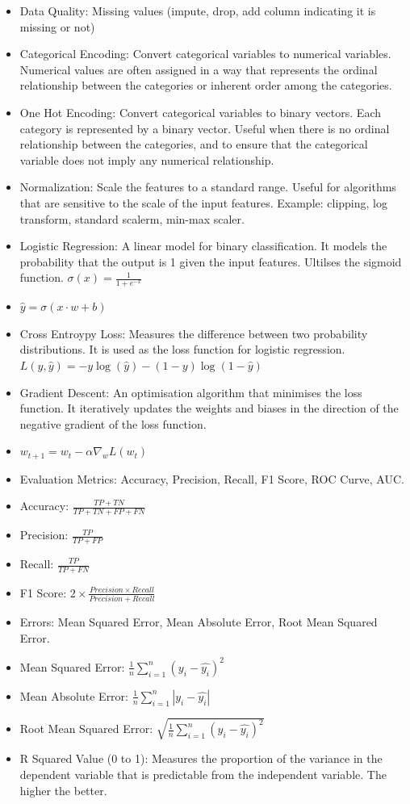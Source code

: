 \documentclass[10pt, landscape]{article}
\begin{document}
\begin{multicols*}{4}
  \begin{itemize}
    \item Data Quality: Missing values (impute, drop, add column indicating it is missing or not)
    \item Categorical Encoding: Convert categorical variables to numerical variables. Numerical values are often assigned in a way that represents the ordinal relationship between the categories or inherent order among the categories.
    \item One Hot Encoding: Convert categorical variables to binary vectors. Each category is represented by a binary vector. Useful when there is no ordinal relationship between the categories, and to ensure that the categorical variable does not imply any numerical relationship.
    \item Normalization: Scale the features to a standard range. Useful for algorithms that are sensitive to the scale of the input features. Example: clipping, log transform, standard scalerm, min-max scaler.
    \item Logistic Regression: A linear model for binary classification. It models the probability that the output is 1 given the input features. Ultilses the sigmoid function. $\sigma(x) = \frac{1}{1 + e^{-x}}$
    \item $ \hat{y} = \sigma(x \cdot w + b) $
    \item Cross Entroypy Loss: Measures the difference between two probability distributions. It is used as the loss function for logistic regression. $L(y, \hat{y}) = -y \log(\hat{y}) - (1 - y) \log(1 - \hat{y})$
    \item Gradient Descent: An optimisation algorithm that minimises the loss function. It iteratively updates the weights and biases in the direction of the negative gradient of the loss function.
    \item $w_{t+1} = w_t - \alpha \nabla_w L(w_t)$
    \item Evaluation Metrics: Accuracy, Precision, Recall, F1 Score, ROC Curve, AUC.
    \item Accuracy: $\frac{TP + TN}{TP + TN + FP + FN}$
    \item Precision: $\frac{TP}{TP + FP}$
    \item Recall: $\frac{TP}{TP + FN}$
    \item F1 Score: $2 \times \frac{Precision \times Recall}{Precision + Recall}$
    \item Errors: Mean Squared Error, Mean Absolute Error, Root Mean Squared Error.
    \item Mean Squared Error: $\frac{1}{n} \sum_{i=1}^{n} (y_i - \hat{y_i})^2$
    \item Mean Absolute Error: $\frac{1}{n} \sum_{i=1}^{n} |y_i - \hat{y_i}|$
    \item Root Mean Squared Error: $\sqrt{\frac{1}{n} \sum_{i=1}^{n} (y_i - \hat{y_i})^2}$
    \item R Squared Value (0 to 1): Measures the proportion of the variance in the dependent variable that is predictable from the independent variable. The higher the better.
  \end{itemize}


\end{multicols*}
\end{document}
